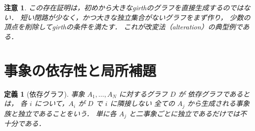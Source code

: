 \documentclass[a5paper,10pt,onecolumn]{jsarticle}
\theoremstyle{mathnotetheorem}
\newtheorem{definition}[theorem]{定義}
\newtheorem{remark}[theorem]{注意}
\begin{document}
\begin{remark}
この存在証明は，初めから大きなgirthのグラフを直接生成するのではない．
短い閉路が少なく，かつ大きな独立集合がないグラフをまず作り，
少数の頂点を削除してgirthの条件を満たす．
これが\emph{改変法}（alteration）の典型例である．
\end{remark}

\section{事象の依存性と局所補題}
\begin{definition}[依存グラフ]
事象 $A_1,\ldots,A_N$ に対するグラフ $D$ が
\emph{依存グラフ}であるとは，
各 $i$ について，$A_i$ が $D$ で $i$ に隣接しない
全ての $A_j$ から生成される事象族と独立であることをいう．
単に各 $A_j$ と二事象ごとに独立であるだけでは不十分である．
\end{definition}
\end{document}
